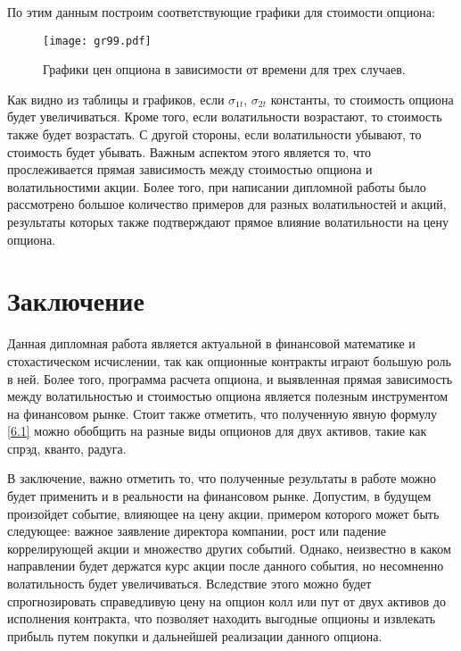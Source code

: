 \documentclass[a4paper, 12pt]{extreport}
\numberwithin{equation}{section}
\begin{document}
	По этим данным построим соответствующие графики для стоимости опциона:
	\vspace{0.3cm}
	
	\begin{figure}[h]
	\begin{center}
		\texttt{[image: gr99.pdf]}	
	\caption{Графики цен опциона в зависимости от времени для трех случаев.}
	\end{center}
	\end{figure}


	Как видно из таблицы и графиков, если $\sigma_{1t}$, $\sigma_{2t}$ константы, то стоимость опциона будет увеличиваться. Кроме того, если волатильности возрастают, то стоимость также будет возрастать. С другой стороны, если волатильности убывают, то стоимость будет убывать. Важным аспектом этого является то, что прослеживается прямая зависимость между стоимостью опциона и волатильностими акции. Более того, при написании дипломной работы было рассмотрено большое количество примеров для разных волатильностей и акций, результаты которых также подтверждают прямое влияние волатильности на цену опциона. 




	\chapter{Заключение}
	
	Данная дипломная работа является актуальной в финансовой математике и стохастическом исчислении, так как опционные контракты играют большую роль в ней. Более того, программа расчета опциона, и выявленная прямая зависимость между волатильностью и стоимостью опциона является полезным инструментом на финансовом рынке. Стоит также отметить, что полученную явную формулу \eqref{6.1} можно обобщить на разные виды опционов для двух активов, такие как спрэд, кванто, радуга.



	В заключение, важно отметить то, что полученные результаты в работе можно будет применить и в реальности на финансовом рынке. Допустим, в будущем произойдет событие, влияющее на цену акции, примером которого может быть следующее: важное заявление директора компании, рост или падение коррелирующей акции и множество других событий. Однако, неизвестно в каком направлении будет держатся курс акции после данного события, но несомненно волатильность будет увеличиваться. Вследствие этого можно будет спрогнозировать справедливую цену на опцион колл или пут от двух активов до исполнения контракта, что позволяет находить выгодные опционы и извлекать прибыль путем покупки и дальнейшей реализации данного опциона.
\end{document}
